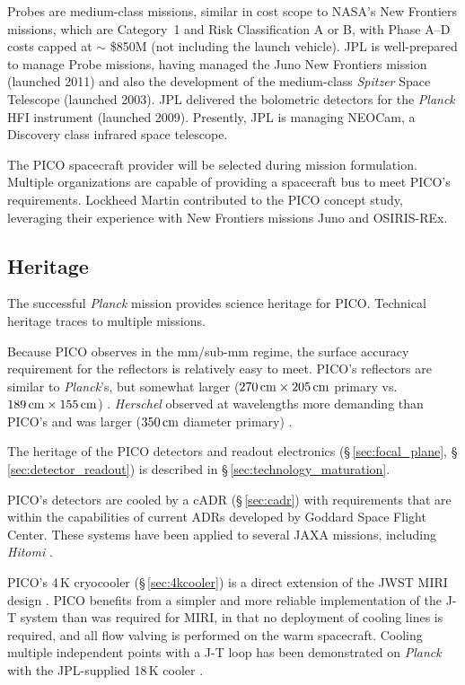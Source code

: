 Probes are medium-class missions, similar in cost scope to NASA's
New Frontiers missions, which are Category~1 and Risk Classification A
or B, with Phase A--D costs capped at $\sim$ \$850M (not including the
launch vehicle). JPL is well-prepared to manage Probe missions, having
managed the Juno New Frontiers mission (launched 2011) and also the
development of the medium-class \textit{Spitzer} Space Telescope (launched
2003). JPL delivered the bolometric detectors for the \textit{Planck}
HFI instrument (launched 2009). Presently, JPL is managing NEOCam, a
Discovery class infrared space telescope.

The PICO spacecraft provider will be selected during mission
formulation. Multiple organizations are capable of providing a
spacecraft bus to meet PICO's requirements. Lockheed Martin
contributed to the PICO concept study, leveraging their experience
with New Frontiers missions Juno and OSIRIS-REx.
 
\subsection{Heritage}
\label{sec:heritage} %

The successful \textit{Planck} mission provides science heritage for
PICO. Technical heritage traces to multiple missions.

Because PICO observes in the mm/sub-mm regime, the surface accuracy
requirement for the reflectors is relatively easy to meet. PICO's
reflectors are similar to \textit{Planck}'s, but somewhat larger
($270\,{\rm cm} \times 205\,{\rm cm}$ primary vs.\
$189\,{\rm cm} \times 155\,{\rm cm}$)
\citep{Gloesener2006}. \textit{Herschel} observed at wavelengths more
demanding than PICO's and was larger ($350\,{\rm cm}$ diameter
primary) \citep{Toulemont2004}.

The heritage of the PICO detectors and readout electronics
(\S\,\ref{sec:focal_plane}, \S\,\ref{sec:detector_readout}) is
described in \S\,\ref{sec:technology_maturation}.


PICO's detectors are cooled by a cADR (\S\,\ref{sec:cadr}) with
requirements that are within the capabilities of current ADRs
developed by Goddard Space Flight Center. These systems have been
applied to several JAXA missions, including \textit{Hitomi} \citep{Shirron2016}.

PICO's 4\,K cryocooler (\S\,\ref{sec:4kcooler}) is a direct extension
of the JWST MIRI design \citep{Durand2008,Rabb2013}. PICO benefits
from a simpler and more reliable implementation of the J-T system than
was required for MIRI, in that no deployment of cooling lines is
required, and all flow valving is performed on the warm
spacecraft. Cooling multiple independent points with a J-T loop has
been demonstrated on \textit{Planck} with the JPL-supplied 18\,K
cooler \citep{Planck2011}.


